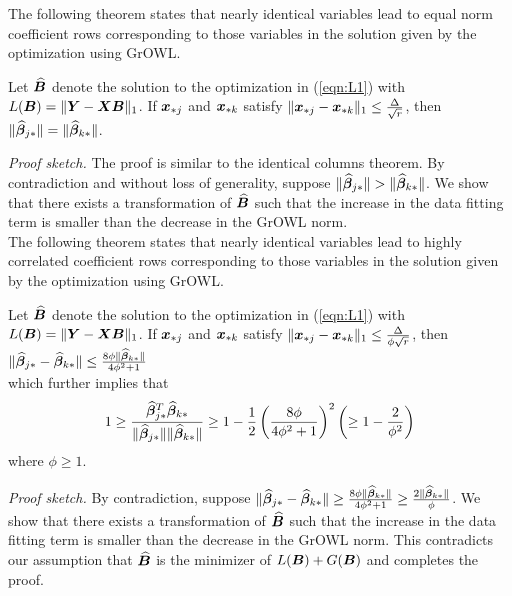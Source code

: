 The following theorem states that nearly identical variables lead to equal norm coefficient rows corresponding to those variables in the solution given by the optimization using GrOWL.
\begin{theorem}\label{thm2}
Let $\widehat {\boldsymbol{B}}$ denote the solution to the optimization in (\ref{eqn:L1}) with $L(\boldsymbol{B}) = \|\boldsymbol{Y} - \boldsymbol{X} \boldsymbol{B} \|_1$.
If $\boldsymbol{x}_{{\ast} j}$ and $\boldsymbol{x}_{{\ast} k}$ satisfy $\|\boldsymbol{x}_{{\ast} j} - \boldsymbol{x}_{{\ast} k}\|_1 \leq \frac{\Delta}{\sqrt{r}} $, then
$\|\widehat {\boldsymbol{\beta}}_{j {\ast}}\| = \|\widehat {\boldsymbol{\beta}}_{k {\ast}}\|$.

\end{theorem}
\textit{Proof sketch.}
The proof is similar to the identical columns theorem. By contradiction and without loss of generality, suppose $\|\widehat {\boldsymbol{\beta}}_{j {\ast}}\| > \|\widehat {\boldsymbol{\beta}}_{k {\ast}}\|$. We show that there exists a transformation of $\widehat{\boldsymbol{B}}$ such that the increase in the data fitting term is smaller than the decrease in the GrOWL norm. \\


The following theorem states that nearly identical variables lead to highly correlated coefficient rows corresponding to those variables in the solution given by the optimization using GrOWL.
\begin{theorem}\label{thm3}
Let $\widehat {\boldsymbol{B}}$ denote the solution to the optimization in (\ref{eqn:L1}) with $L(\boldsymbol{B}) = \|\boldsymbol{Y} - \boldsymbol{X} \boldsymbol{B} \|_1$.
If $\boldsymbol{x}_{{\ast} j}$ and $\boldsymbol{x}_{{\ast} k}$ satisfy $\|\boldsymbol{x}_{{\ast} j} - \boldsymbol{x}_{{\ast} k}\|_1 \leq \frac{\Delta}{\phi\sqrt{r}} $, then
$\|\widehat {\boldsymbol{\beta}}_{j {\ast}} - \widehat {\boldsymbol{\beta}}_{k {\ast}}\| \leq \frac{8\phi \|\widehat {\boldsymbol{\beta}}_{k {\ast}}\|}{4\phi^2+1}$ 
\\which further implies that
$$1 \geq \frac{\widehat {\boldsymbol{\beta}}_{j {\ast}}^T \widehat {\boldsymbol{\beta}}_{k {\ast}}}{\|\widehat {\boldsymbol{\beta}}_{j {\ast}}\|\| \widehat {\boldsymbol{\beta}}_{k {\ast}}\|} \geq 1 - \frac{1}{2}\left( \frac{8\phi}{4\phi^2+1}\right)^2     \left( \geq 1 - \frac{2}{\phi^2}\right)$$ where $\phi \geq 1$.

\end{theorem}
\textit{Proof sketch.}
By contradiction, suppose $\|\widehat {\boldsymbol{\beta}}_{j {\ast}} - \widehat {\boldsymbol{\beta}}_{k {\ast}}\| \geq
\frac{8\phi \|\widehat {\boldsymbol{\beta}}_{k {\ast}}\|}{4\phi^2+1}  \geq \frac{2 \|\widehat {\boldsymbol{\beta}}_{k
    {\ast}}\|}{\phi}$. We show that there exists a transformation of $\widehat{\boldsymbol{B}}$ such that
the increase in the data fitting term is smaller than the decrease in the GrOWL norm. This
contradicts our assumption that $\widehat{\boldsymbol{B}}$ is the minimizer of $L(\boldsymbol{B}) + G(\boldsymbol{B})$ and
completes the proof.\\

